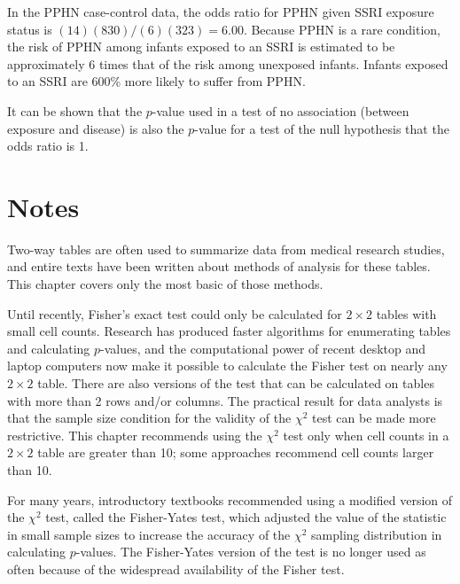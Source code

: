 In the PPHN case-control data, the odds ratio for PPHN given SSRI exposure status is $(14)(830)/(6)(323) = 6.00$.  Because PPHN is a rare condition, the risk of PPHN among infants exposed to an SSRI is estimated to be approximately 6 times that of the risk among unexposed infants.  Infants exposed to an SSRI are 600\% more likely to suffer from PPHN.  

It can be shown that the $p$-value used in a test of no association (between exposure and disease) is also the $p$-value for a test of the null hypothesis that the odds ratio is 1.



\section{Notes}
\label{infForPropNotes}

Two-way tables are often used to summarize data from medical research studies, and entire texts have been written about methods of analysis for these tables.  This chapter covers only the most basic of those methods. 

Until recently, Fisher's exact test could only be calculated for $2 \times 2$ tables with small cell counts. Research has produced faster algorithms for enumerating tables and calculating $p$-values, and the computational power of recent desktop and laptop computers now make it possible to calculate the Fisher test on nearly any $2 \times 2$ table.  There are also versions of the test that can be calculated on tables with more than 2 rows and/or columns.  The practical result for data analysts is that the sample size condition for the validity of the $\chi^2$ test can be made more restrictive.  This chapter recommends using the $\chi^2$ test only when cell counts in a $2 \times 2$ table are greater than 10; some approaches recommend cell counts larger than 10.

For many years, introductory textbooks recommended using a modified version of the $\chi^2$ test, called the Fisher-Yates test, which adjusted the value of the statistic in small sample sizes to increase the accuracy of the $\chi^2$ sampling distribution in calculating $p$-values.  The Fisher-Yates version of the test is no longer used as often because of the widespread availability of the Fisher test.

